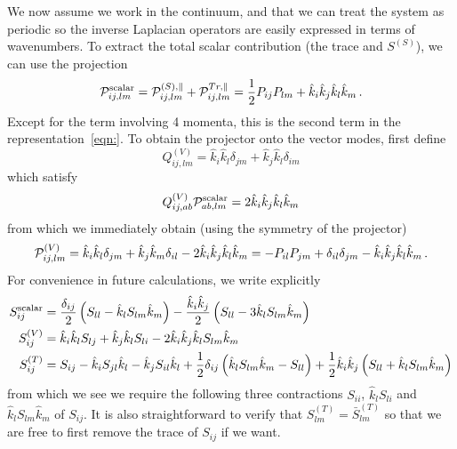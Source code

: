 \documentclass{revtex4}
\begin{document}
We now assume we work in the continuum, and that we can treat the system as periodic so the inverse Laplacian operators are easily expressed in terms of wavenumbers.
To extract the total scalar contribution (the trace and $S^{(S)}$), we can use the projection
\begin{equation}
   \mathcal{P}^{{\rm scalar}}_{ij,lm} = \mathcal{P}_{ij,lm}^{(S),\parallel} + \mathcal{P}_{ij,lm}^{Tr,\parallel} = \frac{1}{2}P_{ij}P_{lm} + \hat{k}_i\hat{k}_j\hat{k}_l\hat{k}_m \, .
\end{equation}
Except for the term involving 4 momenta, this is the second term in the representation~\eqref{eqn:}.
To obtain the projector onto the vector modes, first define
\begin{equation}
  Q^{(V)}_{ij,lm} = \hat{k}_i\hat{k}_l\delta_{jm} + \hat{k}_j\hat{k}_l\delta_{im}
\end{equation}
which satisfy
\begin{equation}
  Q^{(V)}_{ij,ab}\mathcal{P}^{{\rm scalar}}_{ab,lm} = 2\hat{k}_i\hat{k}_j\hat{k}_l\hat{k}_m
\end{equation}
from which we immediately obtain (using the symmetry of the projector)
\begin{equation}
  \mathcal{P}_{ij,lm}^{(V)} = \hat{k}_i\hat{k}_l\delta_{jm} + \hat{k}_j\hat{k}_m\delta_{il} - 2\hat{k}_i\hat{k}_j\hat{k}_l\hat{k}_m = -P_{il}P_{jm} + \delta_{il}\delta_{jm} - \hat{k}_i\hat{k}_j\hat{k}_l\hat{k}_m \, .
\end{equation}
For convenience in future calculations, we write explicitly
\begin{subequations}
\begin{align}
  S_{ij}^{\rm scalar} &= \frac{\delta_{ij}}{2}\left(S_{ll} - \hat{k}_lS_{lm}\hat{k}_m\right) - \frac{\hat{k}_i\hat{k}_j}{2}\left(S_{ll} - 3\hat{k}_lS_{lm}\hat{k}_m\right) \\
  S_{ij}^{(V)} &= \hat{k}_i\hat{k}_lS_{lj} + \hat{k}_j\hat{k}_lS_{li} - 2\hat{k}_i\hat{k}_j\hat{k}_lS_{lm}\hat{k}_m \\
  S_{ij}^{(T)} &= S_{ij} - \hat{k}_iS_{jl}\hat{k}_l - \hat{k}_jS_{il}\hat{k}_l + \frac{1}{2}\delta_{ij}\left(\hat{k}_lS_{lm}\hat{k}_m - S_{ll}\right) + \frac{1}{2}\hat{k}_i\hat{k}_j\left(S_{ll}+\hat{k}_lS_{lm}\hat{k}_m\right) \\
\end{align}
\end{subequations}
from which we see we require the following three contractions $S_{ii}$, $\hat{k}_lS_{li}$ and $\hat{k}_lS_{lm}\hat{k}_m$ of $S_{ij}$.
It is also straightforward to verify that $S_{lm}^{(T)} = \bar{S}_{lm}^{(T)}$ so that we are free to first remove the trace of $S_{ij}$ if we want.
\end{document}
